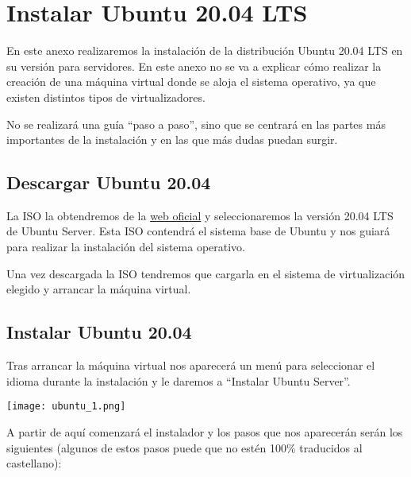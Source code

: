 \hypertarget{instalar_ubuntu_lts}{}

\chapter{Instalar Ubuntu 20.04 LTS}
En este anexo realizaremos la instalación de la distribución Ubuntu 20.04 LTS en su versión para servidores. En este anexo no se va a explicar cómo realizar la creación de una máquina virtual donde se aloja el sistema operativo, ya que existen distintos tipos de virtualizadores.

No se realizará una guía “paso a paso”, sino que se centrará en las partes más importantes de la instalación y en las que más dudas puedan surgir.

\section{Descargar Ubuntu 20.04}
La ISO la obtendremos de la \href{https://ubuntu.com/#download}{web oficial} y seleccionaremos la versión 20.04 LTS de Ubuntu Server. Esta ISO contendrá el sistema base de Ubuntu y nos guiará para realizar la instalación del sistema operativo.

Una vez descargada la ISO tendremos que cargarla en el sistema de virtualización elegido y arrancar la máquina virtual.


\section{Instalar Ubuntu 20.04}
Tras arrancar la máquina virtual nos aparecerá un menú para seleccionar el idioma durante la instalación y le daremos a “Instalar Ubuntu Server”.

\begin{center}
    \texttt{[image: ubuntu\_1.png]}
\end{center}

A partir de aquí comenzará el instalador y los pasos que nos aparecerán serán los siguientes (algunos de estos pasos puede que no estén 100\% traducidos al castellano):

